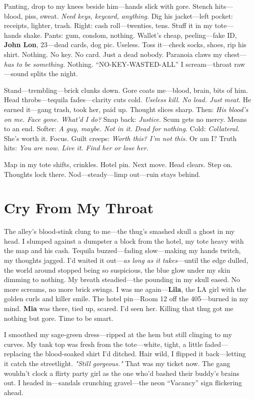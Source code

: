 \documentclass{article}
\begin{document}
Panting, drop to my knees beside him—hands slick with gore. Stench hits—blood, piss, sweat. \textit{Need keys, keycard, anything.} Dig his jacket—left pocket: receipts, lighter, trash. Right: cash roll—twenties, tens. Stuff it in my tote—hands shake. Pants: gum, condom, nothing. Wallet’s cheap, peeling—fake ID, \textbf{John Lon}, 23—dead cards, dog pic. Useless. Toss it—check socks, shoes, rip his shirt. Nothing. No key. No card. Just a dead nobody. Paranoia claws my chest—\textit{has to be something.} Nothing. “NO-KEY-WASTED-ALL” I scream—throat raw—sound splits the night.

Stand—trembling—brick clunks down. Gore coats me—blood, brain, bits of him. Head throbs—tequila fades—clarity cuts cold. \textit{Useless kill. No lead. Just meat.} He earned it—gang trash, took her, paid up. Thought slices sharp. Then: \textit{His blood’s on me. Face gone. What’d I do?} Snap back: \textit{Justice.} Scum gets no mercy. Means to an end. Softer: \textit{A guy, maybe. Not in it. Dead for nothing.} Cold: \textit{Collateral.} She’s worth it. Focus. Guilt creeps: \textit{Worth this? I’m not this.} Or am I? Truth hits: \textit{You are now. Live it. Find her or lose her.}

Map in my tote shifts, crinkles. Hotel pin. Next move. Head clears. Step on. Thoughts lock there. Nod—steady—limp out—ruin stays behind.

\section*{Cry From My Throat}

The alley’s blood-stink clung to me—the thug’s smashed skull a ghost in my head. I slumped against a dumpster a block from the hotel, my tote heavy with the map and his cash. Tequila buzzed—fading slow—making my hands twitch, my thoughts jagged. I’d waited it out—\textit{as long as it takes}—until the edge dulled, the world around stopped being so suspicious, the blue glow under my skin dimming to nothing. My breath steadied—the pounding in my skull eased. No more screams, no more brick swings. I was me again—\textbf{Lila}, the LA girl with the golden curls and killer smile. The hotel pin—Room 12 off the 405—burned in my mind. \textbf{Mia} was there, tied up, scared. I’d seen her. Killing that thug got me nothing but gore. Time to be smart.

I smoothed my sage-green dress—ripped at the hem but still clinging to my curves. My tank top was fresh from the tote—white, tight, a little faded—replacing the blood-soaked shirt I’d ditched. Hair wild, I flipped it back—letting it catch the streetlight. \textit{"Still gorgeous."} That was my ticket now. The gang wouldn’t clock a flirty party girl as the one who’d bashed their buddy’s brains out. I headed in—sandals crunching gravel—the neon “Vacancy” sign flickering ahead.
\end{document}
